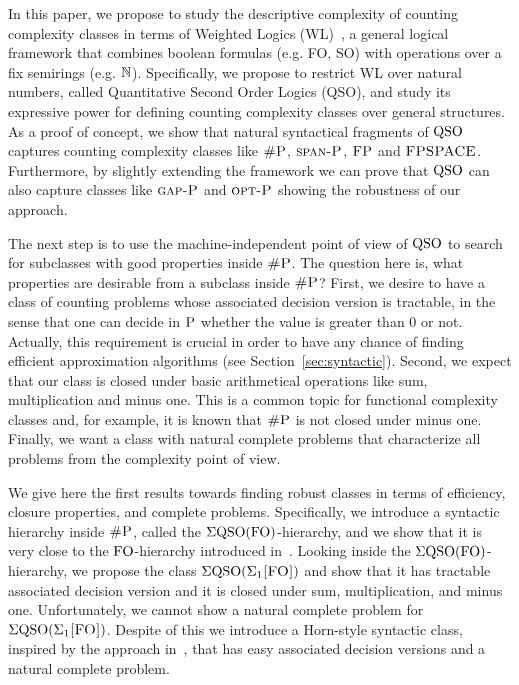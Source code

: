 In this paper, we propose to study the descriptive complexity of counting complexity classes in terms of Weighted Logics (WL)~\cite{DrosteG07}, a general logical framework that combines boolean formulas (e.g. FO, SO) with operations over a fix semirings (e.g. $\mathbb{N}$). 
Specifically, we propose to restrict WL over natural numbers, called Quantitative Second Order Logics (QSO), and study its expressive power for defining counting complexity classes over general structures. 
As a proof of concept, we show that natural syntactical fragments of ${\rm QSO}$ captures counting complexity classes like $\text{\sc \#P}$, $\text{\sc span-P}$, $\text{\sc FP}$ and $\text{\sc FPSPACE}$.
Furthermore, by slightly extending the framework we can prove that ${\rm QSO}$ can also capture classes like $\text{\sc gap-P}$ and $\text{\sc opt-P}$ showing the robustness of our approach.

The next step is to use the machine-independent point of view of ${\rm QSO}$ to search for subclasses with good properties inside $\text{\sc \#P}$. 
The question here is, what properties are desirable from a subclass inside $\text{\sc \#P}$?
First, we desire to have a class of counting problems whose associated decision version is tractable, in the sense that one can decide in $\text{\sc P}$ whether the value is greater than $0$ or not. 
Actually, this requirement is crucial in order to have any chance of finding efficient approximation algorithms (see Section~\ref{sec:syntactic}).
Second, we expect that our class is closed under basic arithmetical operations like sum, multiplication and minus one. 
This is a common topic for functional complexity classes and, for example, it is known that $\text{\sc \#P}$ is not closed under minus one. 
Finally, we want a class with natural complete problems that characterize all problems from the complexity point of view.

We give here the first results towards finding robust classes in terms of efficiency, closure properties, and complete problems. 
Specifically, we introduce a syntactic hierarchy inside $\text{\sc \#P}$, called the $\Sigma{\rm QSO}({\rm FO})$-hierarchy, and we show that it is very close to the ${\rm FO}$-hierarchy introduced in~\cite{SalujaST95}. 
Looking inside the $\Sigma{\rm QSO}({\rm FO})$-hierarchy, we propose the class $\Sigma{\rm QSO}(\Sigma_{1}\textsc{[FO]})$ and show that it has tractable associated decision version and it is closed under sum, multiplication, and minus one. 
Unfortunately, we cannot show a natural complete problem for $\Sigma{\rm QSO}(\Sigma_{1}\textsc{[FO]})$.
Despite of this we introduce a Horn-style syntactic class, inspired by the approach in~\cite{G92}, that has easy associated decision versions and a natural complete problem.

